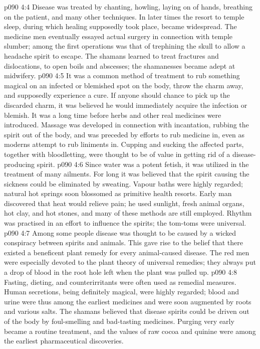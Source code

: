 \vs p090 4:4 Disease was treated by chanting, howling, laying on of hands, breathing on the patient, and many other techniques. In later times the resort to temple sleep, during which healing supposedly took place, became widespread. The medicine men eventually essayed actual surgery in connection with temple slumber; among the first operations was that of trephining the skull to allow a headache spirit to escape. The shamans learned to treat fractures and dislocations, to open boils and abscesses; the shamanesses became adept at midwifery.
\vs p090 4:5 It was a common method of treatment to rub something magical on an infected or blemished spot on the body, throw the charm away, and supposedly experience a cure. If anyone should chance to pick up the discarded charm, it was believed he would immediately acquire the infection or blemish. It was a long time before herbs and other real medicines were introduced. Massage was developed in connection with incantation, rubbing the spirit out of the body, and was preceded by efforts to rub medicine in, even as moderns attempt to rub liniments in. Cupping and sucking the affected parts, together with bloodletting, were thought to be of value in getting rid of a disease\hyp{}producing spirit.
\vs p090 4:6 Since water was a potent fetish, it was utilized in the treatment of many ailments. For long it was believed that the spirit causing the sickness could be eliminated by sweating. Vapour baths were highly regarded; natural hot springs soon blossomed as primitive health resorts. Early man discovered that heat would relieve pain; he used sunlight, fresh animal organs, hot clay, and hot stones, and many of these methods are still employed. Rhythm was practised in an effort to influence the spirits; the tom\hyp{}toms were universal.
\vs p090 4:7 Among some people disease was thought to be caused by a wicked conspiracy between spirits and animals. This gave rise to the belief that there existed a beneficent plant remedy for every animal\hyp{}caused disease. The red men were especially devoted to the plant theory of universal remedies; they always put a drop of blood in the root hole left when the plant was pulled up.
\vs p090 4:8 Fasting, dieting, and counterirritants were often used as remedial measures. Human secretions, being definitely magical, were highly regarded; blood and urine were thus among the earliest medicines and were soon augmented by roots and various salts. The shamans believed that disease spirits could be driven out of the body by foul\hyp{}smelling and bad\hyp{}tasting medicines. Purging very early became a routine treatment, and the values of raw cocoa and quinine were among the earliest pharmaceutical discoveries.

